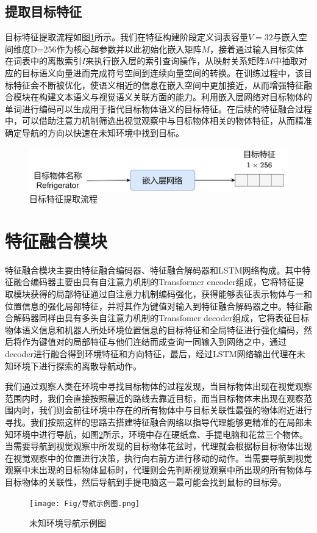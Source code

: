 \subsection{提取目标特征}
目标特征提取流程如图\ref{目标特征提取}所示。我们在特征构建阶段定义词表容量$V = 32$与嵌入空间维度D=256作为核心超参数并以此初始化嵌入矩阵$M$，接着通过输入目标实体在词表中的离散索引$I$来执行嵌入层的索引查询操作，从映射关系矩阵$M$中抽取对应的目标语义向量进而完成符号空间到连续向量空间的转换。在训练过程中，该目标特征会不断被优化，使语义相近的信息在嵌入空间中更加接近，从而增强特征融合模块在构建文本语义与视觉语义关联方面的能力。利用嵌入层网络对目标物体的单词进行编码可以生成用于指代目标物体语义的目标特征。在后续的特征融合过程中，可以借助注意力机制筛选出视觉观察中与目标物体相关的物体特征，从而精准确定导航的方向以快速在未知环境中找到目标。
\begin{figure}[htbp]
    \centering
    \includegraphics[scale=0.10]{Fig/目标特征提取.png}
    \caption{\label{目标特征提取}目标特征提取流程}
\end{figure}



\section{特征融合模块}
特征融合模块主要由特征融合编码器、特征融合解码器和LSTM网络构成。其中特征融合编码器主要由具有自注意力机制的Transformer encoder组成，它将特征提取模块获得的局部特征通过自注意力机制编码强化，获得能够表征表示物体与一和位置信息的强化局部特征，并将其作为键值对输入到特征融合解码器之中。特征融合解码器同样由具有多头自注意力机制的Transfomer decoder组成，它将表征目标物体语义信息和机器人所处环境位置信息的目标特征和全局特征进行强化编码，然后将作为键值对的局部特征与他们连结而成查询一同输入到网络之中，通过decoder进行融合得到环境特征和方向特征，最后，经过LSTM网络输出代理在未知环境下进行探索的离散导航动作。

我们通过观察人类在环境中寻找目标物体的过程发现，当目标物体出现在视觉观察范围内时，我们会直接按照最近的路线去靠近目标，而当目标物体未出现在观察范围内时，我们则会前往环境中存在的所有物体中与目标关联性最强的物体附近进行寻找。我们按照这样的思路去搭建特征融合网络以指导代理能够更精准的在局部未知环境中进行导航，如图\ref{未知环境导航示例图}所示，环境中存在硬纸盒、手提电脑和花盆三个物体。当需要导航到视觉观察中所发现的目标物体花盆时，代理就会根据标目标物体出现在视觉观察中的位置进行决策，执行向右前方进行移动的动作。当需要导航到视觉观察中未出现的目标物体鼠标时，代理则会先判断视觉观察中所出现的所有物体与目标物体的关联性，然后导航到手提电脑这一最可能会找到鼠标的目标旁。
\begin{figure}[htbp]
    \centering
    \texttt{[image: Fig/导航示例图.png]}
    \caption{\label{未知环境导航示例图}未知环境导航示例图}
\end{figure}

